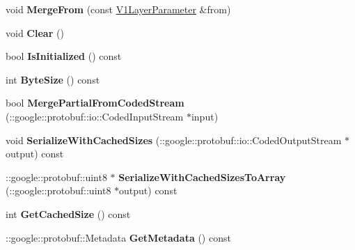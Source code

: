 \begin{DoxyCompactItemize}
\item 
\mbox{\label{classcaffe_1_1_v1_layer_parameter_a0a493f491ef61b195f84e75cf259fc32}} 
void {\bfseries Merge\+From} (const \mbox{\hyperlink{classcaffe_1_1_v1_layer_parameter}{V1\+Layer\+Parameter}} \&from)
\item 
\mbox{\label{classcaffe_1_1_v1_layer_parameter_aa6e1788f223292e709884152967a0559}} 
void {\bfseries Clear} ()
\item 
\mbox{\label{classcaffe_1_1_v1_layer_parameter_a51e56d08cf44f154a7ede653f8faffc9}} 
bool {\bfseries Is\+Initialized} () const
\item 
\mbox{\label{classcaffe_1_1_v1_layer_parameter_aab041ba88abef2282e1a9bc83020ec28}} 
int {\bfseries Byte\+Size} () const
\item 
\mbox{\label{classcaffe_1_1_v1_layer_parameter_a28eab0fc2435eb8a419276ddc5eeba6b}} 
bool {\bfseries Merge\+Partial\+From\+Coded\+Stream} (\+::google\+::protobuf\+::io\+::\+Coded\+Input\+Stream $\ast$input)
\item 
\mbox{\label{classcaffe_1_1_v1_layer_parameter_a85b31f89e7c91cdfbeef4acab061ca67}} 
void {\bfseries Serialize\+With\+Cached\+Sizes} (\+::google\+::protobuf\+::io\+::\+Coded\+Output\+Stream $\ast$output) const
\item 
\mbox{\label{classcaffe_1_1_v1_layer_parameter_a024197db6c2bd521f011ce1ee1a0b6ea}} 
\+::google\+::protobuf\+::uint8 $\ast$ {\bfseries Serialize\+With\+Cached\+Sizes\+To\+Array} (\+::google\+::protobuf\+::uint8 $\ast$output) const
\item 
\mbox{\label{classcaffe_1_1_v1_layer_parameter_a19dab1e090769cb87c0d019ee7c6e434}} 
int {\bfseries Get\+Cached\+Size} () const
\item 
\mbox{\label{classcaffe_1_1_v1_layer_parameter_a141abbc6741324fa2f1efb28e9f6e047}} 
\+::google\+::protobuf\+::\+Metadata {\bfseries Get\+Metadata} () const

\end{DoxyCompactItemize}
